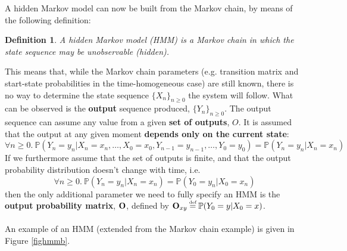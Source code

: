 \documentclass[12pt,a4paper,twoside,openright]{report}
\newtheorem{mydef}{Definition}
\newcommand\myeq{\stackrel{\mathclap{\tiny\mbox{def}}}{=}}
\newcommand\Prob{\mathbb{P}}
\begin{document}
A hidden Markov model can now be built from the Markov chain, by means of the following definition:
\begin{mydef}
\rm	A \emph{hidden Markov model} (HMM) is a Markov chain in which the state sequence may be unobservable (\emph{hidden}).
\end{mydef}
\noindent This means that, while the Markov chain parameters (e.g. transition matrix and start-state probabilities in the time-homogeneous case) are still known, there is no way to determine the state sequence $\{X_n\}_{n\geq 0}$ the system will follow. What can be observed is the \textbf{output} sequence produced, $\{Y_n\}_{n\geq 0}$. The output sequence can assume any value from a given \textbf{set of outputs}, $O$. It is assumed that the output at any given moment \textbf{depends only on the current state}:
\[\forall n \geq 0.\ \Prob(Y_n = y_n | X_n = x_n,\dots,X_0 = x_0, Y_{n-1} = y_{n-1},\dots,Y_0 = y_0) = \Prob(Y_n = y_n | X_n = x_n)\]
If we furthermore assume that the set of outputs is finite, and that the output probability distribution doesn't change with time, i.e. \[\forall n \geq 0.\ \Prob(Y_n = y_n | X_n = x_n) = \Prob(Y_0 = y_n | X_0 = x_n)\]
then the only additional parameter we need to fully specify an HMM is the \textbf{output probability matrix}, ${\bf O}$, defined by ${\bf O}_{xy} \myeq \Prob(Y_0 = y | X_0 = x)$.\\ \\
An example of an HMM (extended from the Markov chain example) is given in Figure \ref{fighmmb}.
\end{document}
